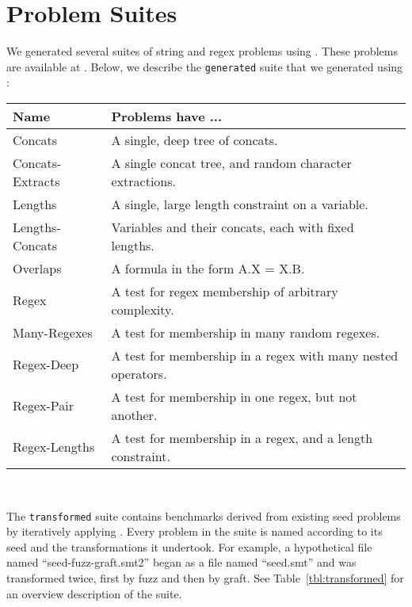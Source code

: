 \section{Problem Suites}
\label{sec:problems}

    We generated several suites of string and regex problems using \fuzzer{}. These problems are available at \problemRepo{}. Below, we describe the \texttt{generated} suite that we generated using \generator{}: \\

    \begin{tabular}{|l|l|}
        \hline
        \textbf{Name}    & \textbf{Problems have ...} \\ \hline
        Concats          & A single, deep tree of concats. \\ \hline
        Concats-Extracts & A single concat tree, and random character extractions. \\ \hline
        Lengths          & A single, large length constraint on a variable. \\ \hline
        Lengths-Concats  & Variables and their concats, each with fixed lengths. \\ \hline
        Overlaps         & A formula in the form A.X = X.B. \\ \hline
        Regex            & A test for regex membership of arbitrary complexity. \\ \hline
        Many-Regexes     & A test for membership in many random regexes. \\ \hline
        Regex-Deep       & A test for membership in a regex with many nested operators. \\ \hline
        Regex-Pair       & A test for membership in one regex, but not another. \\ \hline
        Regex-Lengths    & A test for membership in a regex, and a length constraint. \\ \hline
    \end{tabular}
    \hfill \\


    The \texttt{transformed} suite contains benchmarks derived from existing seed problems by iteratively applying \transformer{}.
    Every problem in the suite is named according to its seed and the transformations it undertook. For example, a hypothetical file named ``seed-fuzz-graft.smt2'' began as a file named ``seed.smt'' and was transformed twice, first by fuzz and then by graft. See Table~\ref{tbl:transformed} for an overview description of the suite. 
    
